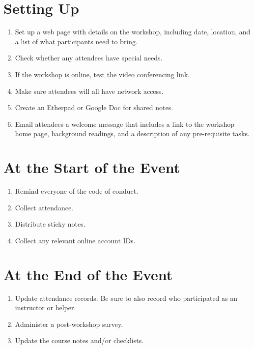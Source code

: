 \documentclass[10pt,statementpaper]{memoir}
\providecommand{\tightlist}{%
  \setlength{\itemsep}{0pt}\setlength{\parskip}{0pt}}
\begin{document}
\section{Setting Up}\label{setting-up}

\begin{enumerate}
\def\labelenumi{\arabic{enumi}.}
\tightlist
\item
  Set up a web page with details on the workshop, including date,
  location, and a list of what participants need to bring.
\item
  Check whether any attendees have special needs.
\item
  If the workshop is online, test the video conferencing link.
\item
  Make sure attendees will all have network access.
\item
  Create an Etherpad or Google Doc for shared notes.
\item
  Email attendees a welcome message that includes a link to the workshop
  home page, background readings, and a description of any pre-requisite
  tasks.
\end{enumerate}

\section{At the Start of the Event}\label{at-the-start-of-the-event}

\begin{enumerate}
\def\labelenumi{\arabic{enumi}.}
\tightlist
\item
  Remind everyone of the code of conduct.
\item
  Collect attendance.
\item
  Distribute sticky notes.
\item
  Collect any relevant online account IDs.
\end{enumerate}

\section{At the End of the Event}\label{at-the-end-of-the-event}

\begin{enumerate}
\def\labelenumi{\arabic{enumi}.}
\tightlist
\item
  Update attendance records. Be sure to also record who participated as
  an instructor or helper.
\item
  Administer a post-workshop survey.
\item
  Update the course notes and/or checklists.
\end{enumerate}
\end{document}
